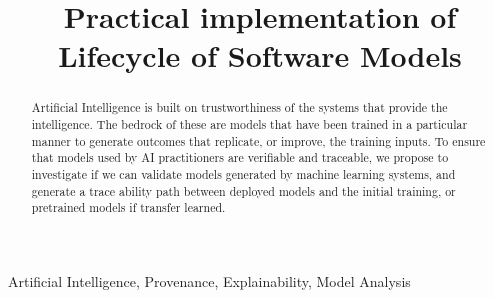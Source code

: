 \documentclass[conference]{IEEEtran}
\begin{document}
\title{
Practical implementation of Lifecycle of Software Models
}

\author{

}

\maketitle

\begin{abstract}
Artificial Intelligence is built on trustworthiness of the systems that provide the intelligence.
The bedrock of these are models that have been trained in a particular manner to generate outcomes that replicate, or improve, the training inputs. To ensure that models used by AI practitioners are verifiable and traceable, we propose to investigate if we can validate models generated by machine learning systems, and generate a trace ability path between deployed models and the initial training, or pretrained models if transfer learned.
\end{abstract}

\begin{IEEEkeywords}
Artificial Intelligence, Provenance, Explainability, Model Analysis\end{IEEEkeywords}







\end{document}
